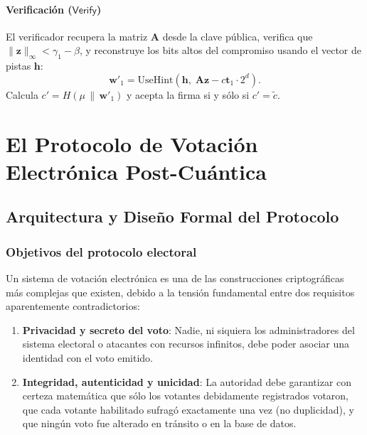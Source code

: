 \documentclass[11pt,a4paper,twoside,openright]{book}
\theoremstyle{plain}
\theoremstyle{definition}
\theoremstyle{remark}
\newcommand{\vv}[1]{\mathbf{#1}}
\newcommand{\mm}[1]{\mathbf{#1}}
\newcommand{\Verify}{\mathsf{Verify}}
\newcommand{\UseHint}{\mathrm{UseHint}}
\begin{document}
\subsection{Verificaci\'on ($\Verify$)}
El verificador recupera la matriz $\mm{A}$ desde la clave p\'ublica, verifica que $\|\vv{z}\|_\infty < \gamma_1 - \beta$, y reconstruye los bits altos del compromiso usando el vector de pistas $\vv{h}$:
\[
  \vv{w}'_1 = \UseHint(\vv{h},\; \mm{A}\vv{z} - c \vv{t}_1 \cdot 2^d).
\]
Calcula $c' = H(\mu \,\|\, \vv{w}'_1)$ y acepta la firma si y s\'olo si $c' = \tilde{c}$.

\part{El Protocolo de Votaci\'on Electr\'onica Post-Cu\'antica}

\chapter{Arquitectura y Dise\~no Formal del Protocolo}
\label{chap:diseno_protocolo}

\section{Objetivos del protocolo electoral}

Un sistema de votaci\'on electr\'onica es una de las construcciones criptogr\'aficas m\'as complejas que existen, debido a la tensi\'on fundamental entre dos requisitos aparentemente contradictorios:
\begin{enumerate}
  \item \textbf{Privacidad y secreto del voto}: Nadie, ni siquiera los administradores del sistema electoral o atacantes con recursos infinitos, debe poder asociar una identidad con el voto emitido.
  \item \textbf{Integridad, autenticidad y unicidad}: La autoridad debe garantizar con certeza matem\'atica que s\'olo los votantes debidamente registrados votaron, que cada votante habilitado sufrag\'o exactamente una vez (no duplicidad), y que ning\'un voto fue alterado en tr\'ansito o en la base de datos.
\end{enumerate}
\end{document}
